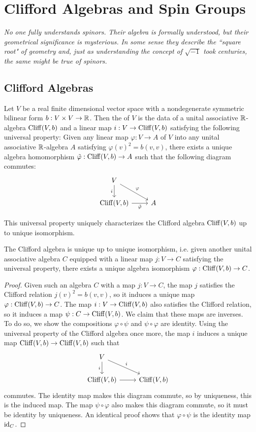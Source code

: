 
\chapter{Clifford Algebras and Spin Groups}
%
\subsectionend
$ $\\
\emph{No one fully understands spinors. Their algebra is formally understood,
but their geometrical significance is mysterious. In some sense they describe
the ``square root" of geometry and, just as understanding the concept of
$\sqrt{-1}$ took centuries, the same might be true of spinors.} \\
%
%
\subsectionend
%
\section{Clifford Algebras}
%
\begin{defn}
Let $V$ be a real finite dimensional vector space with a nondegenerate
symmetric bilinear form $b : V \times V \to \mathbb{R}$. Then the 
of $V$ is the data of a unital associative $\mathbb{R}$-algebra $\operatorname{Cliff}(V,b)$ and a linear
map $i : V \to \operatorname{Cliff}(V,b)$ satisfying the following universal property:
Given any linear map $\varphi : V \to A$ of $V$ into any unital associative
$\mathbb{R}$-algebra $A$ satisfying $\varphi(v)^2 = b(v,v)$, there exists a unique algebra
homomorphism $\tilde{\varphi}: \operatorname{Cliff}(V,b) \to A$ such that the following
diagram commutes:
%
\[\begin{tikzcd}
V \ar[dr, "\varphi"] \ar[d, "i"'] \\
\Cliff(V,b) \ar[r, "\tilde{\varphi}"'] & A
\end{tikzcd}\]
\end{defn}
%
This universal property uniquely characterizes the Clifford algebra $\operatorname{Cliff}(V,b)$
up to unique isomorphism.
%
\begin{thm}
The Clifford algebra is unique up to unique isomorphism, i.e. given
another unital associative algebra $C$ equipped with a linear map $j : V \to C$
satisfying the universal property, there exists a unique algebra isomorphism
$\varphi : \operatorname{Cliff}(V,b) \to C$.
\end{thm}
%
\begin{proof}
Given such an algebra $C$ with a map $j: V \to C$, the map $j$
satisfies the Clifford relation $j(v)^2 = b(v,v)$, so it induces a unique map
$\varphi : \operatorname{Cliff}(V,b) \to C$. The map $i : V \to \operatorname{Cliff}(V,b)$ also
satisfies the Clifford relation, so it induces a map $\psi : C \to \operatorname{Cliff}(V,b)$.
We claim that these maps are inverses. To do so, we show the compositions
$\varphi \circ \psi$ and $\psi \circ \varphi$ are identity. Using the
universal property of the Clifford algebra once more, the map $i$ induces
a unique map $\operatorname{Cliff}(V,b) \to \operatorname{Cliff}(V,b)$ such that
\[\begin{tikzcd}
V \ar[dr, "i"] \ar[d, "i"'] \\
\Cliff(V,b) \ar[r] & \Cliff(V,b)
\end{tikzcd}\]
commutes. The identity map makes this diagram commute, so by uniqueness, this is
the induced map. The map $\psi \circ \varphi$ also makes this diagram commute,
so it must be identity by uniqueness. An identical proof shows that
$\varphi \circ \psi$ is the identity map $\operatorname{id}_C$.
\end{proof}
